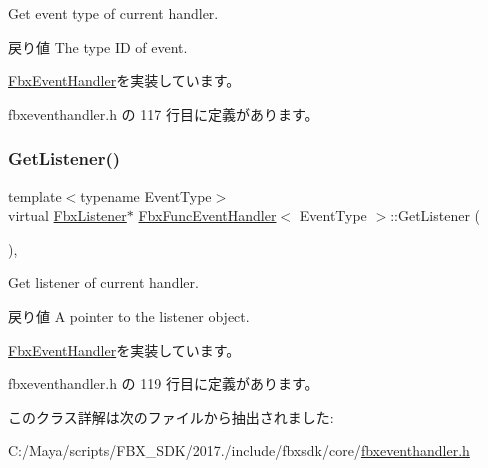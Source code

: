 Get event type of current handler. \begin{DoxyReturn}{戻り値}
The type ID of event. 
\end{DoxyReturn}


\hyperlink{class_fbx_event_handler_a0b42d2b93e63d866975f468a481c9f3c}{Fbx\+Event\+Handler}を実装しています。



 fbxeventhandler.\+h の 117 行目に定義があります。

\mbox{\label{class_fbx_func_event_handler_af196b87b07e698704615056be5923745}} 
\subsubsection{\texorpdfstring{Get\+Listener()}{GetListener()}}
{\footnotesize\ttfamily template$<$typename Event\+Type$>$ \\
virtual \hyperlink{class_fbx_listener}{Fbx\+Listener}$\ast$ \hyperlink{class_fbx_func_event_handler}{Fbx\+Func\+Event\+Handler}$<$ Event\+Type $>$\+::Get\+Listener (\begin{DoxyParamCaption}{ }\end{DoxyParamCaption})\hspace{0.3cm}{\ttfamily [inline]}, {\ttfamily [virtual]}}

Get listener of current handler. \begin{DoxyReturn}{戻り値}
A pointer to the listener object. 
\end{DoxyReturn}


\hyperlink{class_fbx_event_handler_a6d496102fe1253372bb042840c2d45a7}{Fbx\+Event\+Handler}を実装しています。



 fbxeventhandler.\+h の 119 行目に定義があります。



このクラス詳解は次のファイルから抽出されました\+:\begin{DoxyCompactItemize}
\item 
C\+:/\+Maya/scripts/\+F\+B\+X\+\_\+\+S\+D\+K/2017./include/fbxsdk/core/\hyperlink{fbxeventhandler_8h}{fbxeventhandler.\+h}\end{DoxyCompactItemize}
